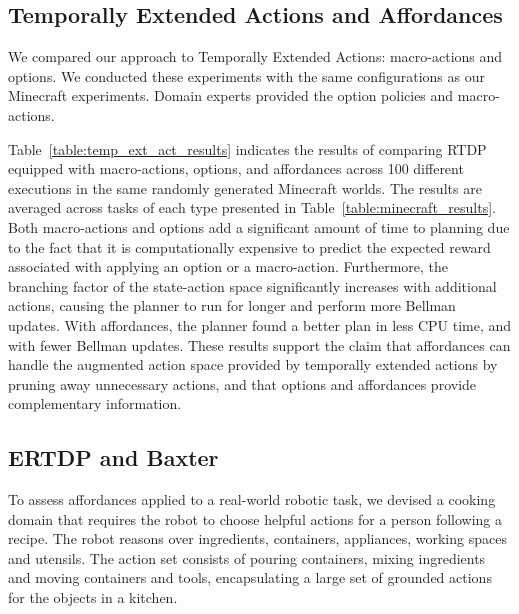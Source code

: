 \documentclass[letterpaper]{article}
\begin{document}
\subsection{Temporally Extended Actions and Affordances}

We compared our approach to Temporally Extended Actions: macro-actions
and options. We conducted these experiments with the same
configurations as our Minecraft experiments. Domain experts provided
the option policies and macro-actions.

Table~\ref{table:temp_ext_act_results} indicates the results of
comparing RTDP equipped with macro-actions, options, and affordances
across 100 different executions in the same randomly generated
Minecraft worlds. The results are averaged across tasks of each type
presented in Table~\ref{table:minecraft_results}. Both macro-actions
and options add a significant amount of time to planning due to the fact that
it is computationally expensive to predict the
expected reward associated with applying an option or a
macro-action. Furthermore, the branching factor of the state-action
space significantly increases with additional actions,
causing the planner to run for longer and perform more Bellman
updates. With affordances, the planner found a better plan in less CPU
time, and with fewer Bellman updates. These results support the claim
that affordances can handle the augmented action space provided by
temporally extended actions by pruning away unnecessary actions, and
that options and affordances provide complementary information.

\subsection{ERTDP and Baxter}

To assess affordances applied to a real-world robotic task, we devised
a cooking domain that requires the robot to choose helpful actions for
a person following a recipe.  The robot reasons over ingredients,
containers, appliances, working spaces and utensils. The action set
consists of pouring containers, mixing ingredients and moving containers and tools, 
encapsulating a large set of grounded actions for
the objects in a kitchen.
\end{document}
